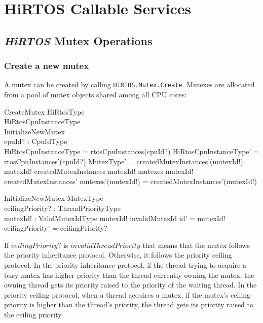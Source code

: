 \documentclass[11pt,letterpaper,twoside,openany]{book}
\begin{document}
\section{HiRTOS Callable Services}

\subsection{\emph{HiRTOS} Mutex Operations}

\subsubsection{Create a new mutex}

A mutex can be created by calling \verb`HiRTOS.Mutex.Create`. Mutexes are allocated from a pool of
mutex objects shared among all CPU cores:

\begin{schema}{CreateMutex}
   \Delta HiRtosType \\
   \Delta HiRtosCpuInstanceType \\
   InitializeNewMutex \\
   cpuId? : CpuIdType \\
\where
   \theta HiRtosCpuInstanceType = rtosCpuInstances(cpuId?)
\also
   \theta HiRtosCpuInstanceType' = rtosCpuInstances'(cpuId?)
\also
   \theta MutexType' = createdMutexInstances'(mutexId!)
\also
   mutexId! \notin \dom createdMutexInstances
\also
   mutexId! \notin \dom mutexes
\also
   mutexId! \in \dom createdMutexInstances'
\also
   mutexes'(mutexId!) = createdMutexInstances'(mutexId!)
\end{schema}

\begin{schema}{InitializeNewMutex}
   \Delta MutexType \\
   ceilingPriority? : ThreadPriorityType \\
   mutexId! : ValidMutexIdType
\where
   mutexId! \neq invalidMutexId
\also
   id' = mutexId!
\also
   ceilingPriority' = ceilingPriority?
\end{schema}

If $ceilingPriority?$ is $invalidThreadPriority$ that means that the mutex follows the priority
inheritance protocol. Otherwise, it follows the priority ceiling protocol. In the priority inheritance
protocol, if the thread trying to acquire a busy mutex has higher priority than the thread currently
owning the mutex, the owning thread gets its priority raised to the priority of the waiting thread.
In the priority ceiling protocol, when a thread acquires a mutex, if the mutex's ceiling priority is
higher than the thread's priority, the thread gets its priority raised to the ceiling priority.
\end{document}
